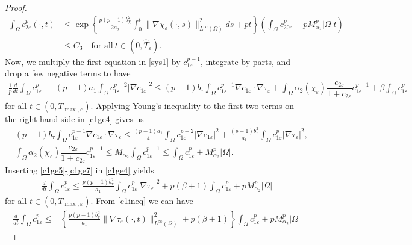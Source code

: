 \documentclass[a4paper,10pt]{article}
\theoremstyle{definition}
\begin{document}
\begin{proof}
\begin{align}
  \label{c2p_bound}
  \nonumber \int_\Omega c^p_{2\varepsilon}(\cdot, t) & \leq \exp\left\{\frac{p(p - 1) b_\chi^2}{2 a_2} \int_0^t \|\nabla \chi_\varepsilon(\cdot, s)\|^2_{L^\infty(\Omega)}ds + pt\right\}\left(\int_\Omega c_{20\varepsilon}^p + p M_{\alpha_1}^p |\Omega|t\right)   \\[5pt]
  & \leq C_3 \quad \text{for all}~ t \in (0, \widehat{T}_\varepsilon).
\end{align}
\noindent
Now, we multiply the first equation in \eqref{sys1} by $c_{1 \varepsilon}^{p - 1}$, integrate by parts, and drop a few negative terms to have
\begin{align}
\label{c1ge4}
  \frac{1}{p} \frac{d}{dt} \int_\Omega c_{1\varepsilon}^p & + (p - 1) a_1  \int_\Omega c_{1\varepsilon}^{p - 2}|\nabla c_{1\varepsilon}|^2 \leq (p - 1) b_\tau \int_\Omega c_{1\varepsilon}^{p - 1}\nabla c_{1\varepsilon} \cdot \nabla \tau_\varepsilon + \int_\Omega \alpha_2(\chi_\varepsilon) \dfrac{c_{2\varepsilon} }{1 + c_{2\varepsilon}} c_{1\varepsilon}^{p - 1} + \beta \int_\Omega c_{1\varepsilon}^p
\end{align}
for all $t \in (0, T_{\max, \varepsilon})$. Applying Young's inequality to the first two terms on the right-hand side in \eqref{c1ge4} gives us
\begin{align}
  \label{c1ge5}
  & (p - 1) b_\tau \int_\Omega c_{1\varepsilon}^{p - 1} \nabla c_{1\varepsilon} \cdot \nabla \tau_\varepsilon\leq \frac{(p - 1) a_1}{4} \int_\Omega c_{1\varepsilon}^{p - 2} |\nabla c_{1 \varepsilon}|^2 + \frac{(p - 1) b_\tau^2}{ a_1} \int_\Omega c_{1\varepsilon}^p |\nabla \tau_\varepsilon|^2, \\
  \label{c1ge7}
  & \int_\Omega \alpha_2(\chi_\varepsilon) \dfrac{c_{2\varepsilon} }{1 + c_{2\varepsilon}} c_{1\varepsilon}^{p - 1}  \leq M_{\alpha_2} \int_\Omega c_{1\varepsilon}^{p - 1} \leq \int_\Omega c_{1\varepsilon}^p + M_{\alpha_2}^p |\Omega|.
\end{align}
Inserting \eqref{c1ge5}-\eqref{c1ge7} in \eqref{c1ge4} yields
\begin{align}
  \label{c1ineq}
   \frac{d}{dt} \int_\Omega c_{1\varepsilon}^p \leq  \frac{p(p - 1) b_\tau^2 }{ a_1} \int_\Omega c_{1\varepsilon}^p |\nabla \tau_\varepsilon|^2 + p(\beta + 1) \int_\Omega c_{1\varepsilon}^p + pM_{\alpha_2}^p |\Omega|
  \end{align}
for all $t \in (0, T_{\max, \varepsilon})$. From \eqref{c1ineq} we can have
\begin{align}
  \label{c1ineq1}
  \frac{d}{dt} \int_\Omega c_{1\varepsilon}^p \leq & \left\{\frac{p(p - 1) b_\tau^2}{a_1} \|\nabla \tau_\varepsilon(\cdot, t)\|^2_{L^\infty(\Omega)} + p (\beta + 1)\right\} \int_\Omega c_{1\varepsilon}^p + p M_{\alpha_2}^p |\Omega|

\end{align}
\end{proof}
\end{document}
